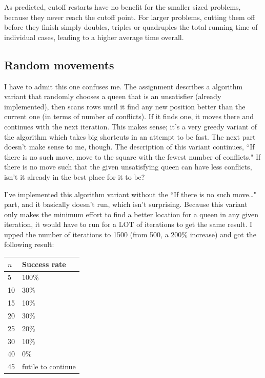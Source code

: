 \documentclass{article}
\begin{document}
\begin{doublespace}
As predicted, cutoff restarts have no benefit for the smaller sized problems, because they never reach the cutoff point. For larger problems, cutting them off before they finish simply doubles, triples or quadruples the total running time of individual cases, leading to a higher average time overall. 


\subsection{Random movements}
I have to admit this one confuses me. The assignment describes a algorithm variant that randomly chooses a queen that is an unsatisfier (already implemented), then scans rows until it find any new position better than the current one (in terms of number of conflicts). If it finds one, it moves there and continues with the next iteration. This makes sense; it's a very greedy variant of the algorithm which takes big shortcuts in an attempt to be fast. The next part doesn't make sense to me, though. The description of this variant continues, ``If there is no such move, move to the square with the fewest number of conflicts." If there is no move such that the given unsatisfying queen can have less conflicts, isn't it already in the best place for it to be?

I've implemented this algorithm variant without the ``If there is no such move\dots" part, and it basically doesn't run, which isn't surprising. Because this variant only makes the minimum effort to find a better location for a queen in any given iteration, it would have to run for a LOT of iterations to get the same result. I upped the number of iterations to 1500 (from 500, a 200\% increase) and got the following result:

\begin{center}
\begin{tabular}{|l | l |}
\hline
	$n$ & Success rate \\ \hline
	5 & 100\% \\ \hline
	10 & 30\% \\ \hline
	15 & 10\% \\ \hline
	20 & 30\% \\ \hline
	25 & 20\% \\ \hline
	30 & 10\% \\ \hline
	40 & 0\% \\ \hline
	45 & futile to continue \\ \hline
\end{tabular}
\end{center}


\end{doublespace}
\end{document}
